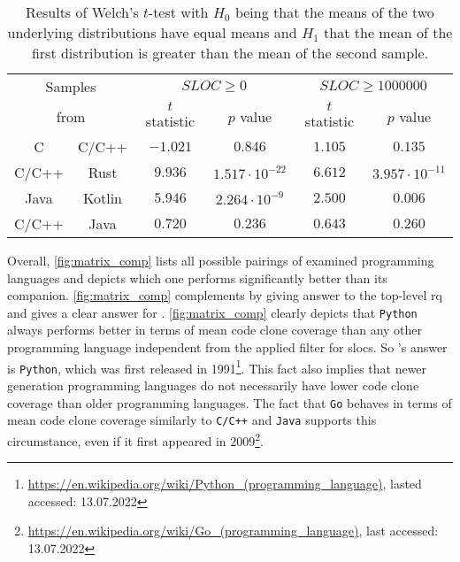 \begin{table}[tbh!]
	\centering
	\begin{tabular}{|cc||c|c||c|c|}
		\hline
		\multicolumn{2}{|c||}{Samples} & \multicolumn{2}{c||}{$SLOC \geq 0$} & \multicolumn{2}{c|}{$SLOC \geq 1000000$}  \\
		\multicolumn{2}{|c||}{from} & \multicolumn{1}{c}{$t$ statistic} & \multicolumn{1}{c||}{$p$ value} & \multicolumn{1}{c}{$t$ statistic} & $p$ value \\
		\hline
		\hline
		C & C/C++ & $-1.021$ & $0.846$ & $1.105$ & $0.135$ \\
		\hline
		\hline
		C/C++ & Rust & $9.936$ & $1.517 \cdot 10^{-22}$ & $6.612$ & $3.957 \cdot 10^{-11}$ \\
		\hline
		Java & Kotlin & $5.946$ & $2.264 \cdot 10^{-9}$ & $2.500$ & $0.006$ \\
		\hline
		\hline
		C/C++ & Java & $0.720$ & $0.236$ & $0.643$ & $0.260$ \\
		\hline
	\end{tabular}
	\caption{Results of Welch's $t$-test with $H_0$ being that the means of the two underlying distributions have equal means and $H_1$ that the mean of the first distribution is greater than the mean of the second sample.}
	\label{tab:stat_test}
\end{table}

Overall, \autoref{fig:matrix_comp} lists all possible pairings of examined programming languages and depicts which one performs significantly better than its companion. \autoref{fig:matrix_comp} complements  by giving answer to the top-level \ac{rq} and gives a clear answer for .
\autoref{fig:matrix_comp} clearly depicts that \texttt{Python} always performs better in terms of mean code clone coverage than any other programming language independent from the applied filter for \aclp{sloc}. So  's answer is \texttt{Python}, which was first released in 1991\footnote{\url{https://en.wikipedia.org/wiki/Python_(programming_language)}, lasted accessed: 13.07.2022}.
This fact also implies that newer generation programming languages do not necessarily have lower code clone coverage than older programming languages. The fact that \texttt{Go} behaves in terms of mean code clone coverage similarly to \texttt{C/C++} and \texttt{Java} supports this circumstance, even if it first appeared in 2009\footnote{\url{https://en.wikipedia.org/wiki/Go_(programming_language)}, last accessed: 13.07.2022}.


